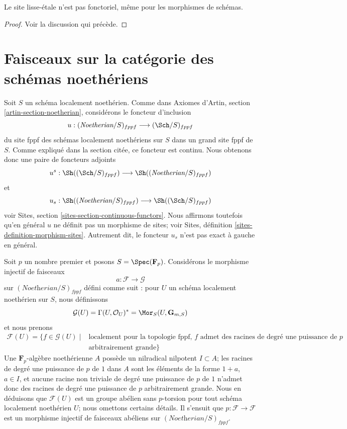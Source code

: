 \begin{lemma}
\label{lemma-lisse-etale-not-functorial}
Le site lisse-\'etale n'est pas fonctoriel, même pour les morphismes de schémas.
\end{lemma}

\begin{proof}
Voir la discussion qui précède.
\end{proof}






\section{Faisceaux sur la catégorie des schémas noethériens}
\label{section-sheaves-locally-Noetherian}

\noindent
Soit $S$ un schéma localement noethérien. Comme dans
Axiomes d'Artin, section \ref{artin-section-noetherian},
considérons le foncteur d'inclusion
$$
u : (\textit{Noetherian}/S)_{fppf} \longrightarrow (\Sch/S)_{fppf}
$$
du site fppf des schémas localement noethériens sur $S$ dans un
grand site fppf de $S$. Comme expliqué dans la section citée,
ce foncteur est continu. Nous obtenons donc une paire de foncteurs adjoints
$$
u^s :
\Sh((\Sch/S)_{fppf})
\longrightarrow
\Sh((\textit{Noetherian}/S)_{fppf})
$$
et
$$
u_s :
\Sh((\textit{Noetherian}/S)_{fppf})
\longrightarrow
\Sh((\Sch/S)_{fppf})
$$
voir Sites, section \ref{sites-section-continuous-functors}.
Nous affirmons toutefois qu'en général $u$ ne définit pas un
morphisme de sites; voir Sites, définition \ref{sites-definition-morphism-sites}.
Autrement dit, le foncteur $u_s$ n'est pas exact à gauche en général.

\medskip\noindent
Soit $p$ un nombre premier et posons $S = \Spec(\mathbf{F}_p)$.
Considérons le morphisme injectif de faisceaux
$$
a : \mathcal{F} \longrightarrow \mathcal{G}
$$
sur $(\textit{Noetherian}/S)_{fppf}$ défini comme suit : pour $U$
un schéma localement noethérien sur $S$, nous définissons
$$
\mathcal{G}(U) = \Gamma(U, \mathcal{O}_U)^* =
\Mor_S(U, \mathbf{G}_{m, S})
$$
et nous prenons
$$
\begin{aligned}
\mathcal{F}(U) = \{f \in \mathcal{G}(U) \mid {}&
\text{localement pour la topologie fppf, }f
\text{ admet des racines de degré une puissance de }p\\
&\text{arbitrairement grande}\}
\end{aligned}
$$
Une $\mathbf{F}_p$-algèbre noethérienne $A$ possède un nilradical nilpotent
$I \subset A$; les racines de degré une puissance de $p$ de $1$ dans $A$ sont les
éléments de la forme $1 + a$, $a \in I$, et aucune racine non triviale
de degré une puissance de $p$ de $1$ n'admet donc des racines de degré une puissance de $p$ arbitrairement grande. Nous en déduisons
que $\mathcal{F}(U)$ est un groupe abélien sans $p$-torsion pour tout schéma
localement noethérien $U$; nous omettons certains détails. Il s'ensuit que
$p : \mathcal{F} \to \mathcal{F}$
est un morphisme injectif de faisceaux abéliens sur $(\textit{Noetherian}/S)_{fppf}$.

